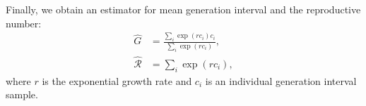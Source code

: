 \documentclass{article}
\newcommand{\RR}{\ensuremath{{\mathcal R}}}
\begin{document}
Finally, we obtain an estimator for mean generation interval and the reproductive number:
\begin{equation}
\begin{aligned}
\hat{G} &= \frac{\sum_{i} \exp(r c_i) c_i}{\sum_{i} \exp(r c_i)},\\
\hat{\RR} &= \sum_{i} \exp(r c_i),
\end{aligned}
\end{equation}
where $r$ is the exponential growth rate and $c_i$ is an individual generation interval sample.


\end{document}
